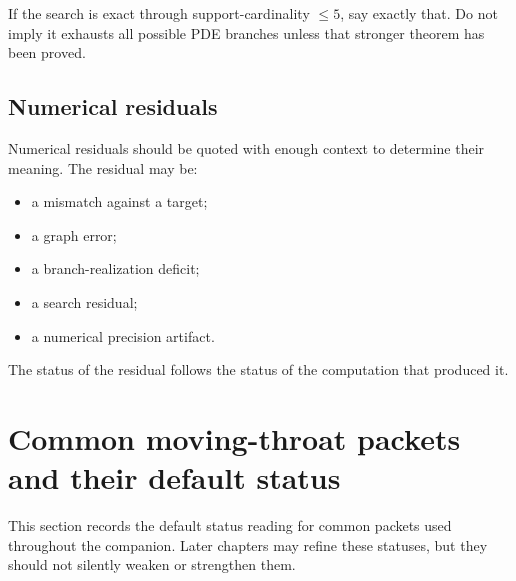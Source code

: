 If the search is exact through support-cardinality \(\leq5\), say exactly that.  Do not imply it exhausts all possible PDE branches unless that stronger theorem has been proved.

\subsection{Numerical residuals}
\label{subsec:numerical-residuals}

Numerical residuals should be quoted with enough context to determine their meaning.  The residual may be:
\begin{itemize}[leftmargin=2.2em]
  \item a mismatch against a target;
  \item a graph error;
  \item a branch-realization deficit;
  \item a search residual;
  \item a numerical precision artifact.
\end{itemize}
The status of the residual follows the status of the computation that produced it.

\section{Common moving-throat packets and their default status}
\label{sec:common-packets-default-status}

This section records the default status reading for common packets used throughout the companion.  Later chapters may refine these statuses, but they should not silently weaken or strengthen them.

